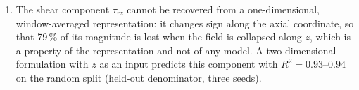 \begin{enumerate}
\item The shear component $\tau_{rz}$ cannot be recovered from a one-dimensional, window-averaged representation: it changes sign along the axial coordinate, so that 79\,\% of its magnitude is lost when the field is collapsed along $z$, which is a property of the representation and not of any model. A two-dimensional formulation with $z$ as an input predicts this component with $R^2 = 0.93$--$0.94$ on the random split (held-out denominator, three seeds). %

\end{enumerate}

